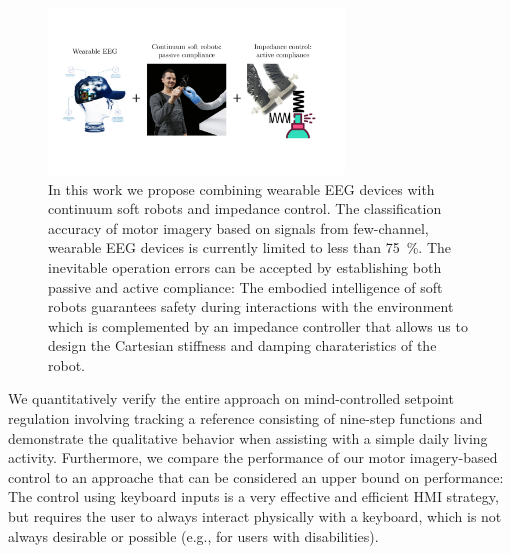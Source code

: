 \begin{figure}[hbt]
    \centering
    \includegraphics[width=0.7\textwidth]{braincontrol/figures/embodied_computational_intelligence/embodied_and_computational_intelligence_cropped.pdf}
    \caption{In this work we propose combining wearable \gls{EEG} devices with continuum soft robots and impedance control. The classification accuracy of motor imagery based on signals from few-channel, wearable \gls{EEG} devices is currently limited to less than \SI{75}{\percent}. The inevitable operation errors can be accepted by establishing both passive and active compliance: The embodied intelligence of soft robots guarantees safety during interactions with the environment which is complemented by an impedance controller that allows us to design the Cartesian stiffness and damping charateristics of the robot.}
    \label{fig:braincontrol:embodied_computational_intelligence}
\end{figure}
 
We quantitatively verify the entire approach on mind-controlled setpoint regulation involving tracking a reference consisting of nine-step functions and demonstrate the qualitative behavior when assisting with a simple daily living activity. 
Furthermore, we compare the performance of our motor imagery-based control to an approache that can be considered an upper bound on performance: The control using keyboard inputs is a very effective and efficient \gls{HMI} strategy, but requires the user to always interact physically with a keyboard,
which is not always desirable or possible (e.g., for users with disabilities).

